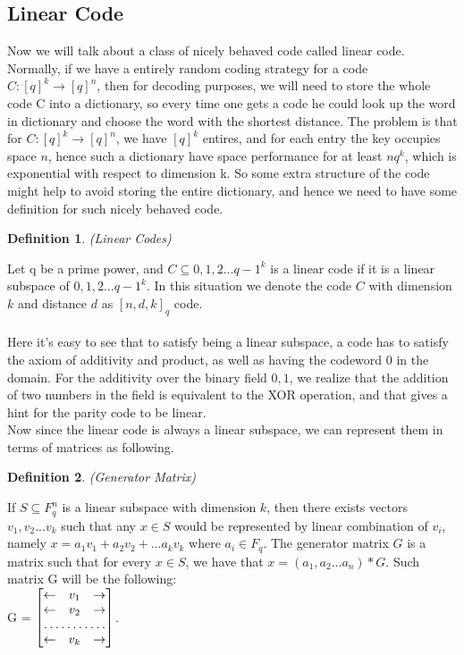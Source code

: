 \documentclass{article}
\newtheorem{Definition}{Definition}
\begin{document}
\subsection{Linear Code}
Now we will talk about a class of nicely behaved code called linear code. Normally, if we have a entirely random coding strategy for a code $C:[q]^k \rightarrow [q]^n$, then for decoding purposes, we will need to store the whole code C into a dictionary, so every time one gets a code he could look up the word in dictionary and choose the word with the shortest distance. The problem is that for $C:[q]^k \rightarrow [q]^n$, we have $[q]^k$ entires, and for each entry the key occupies space $n$, hence such a dictionary have space performance for at least $nq^k$, which is exponential with respect to dimension k. So some extra structure of the code might help to avoid storing the entire dictionary, and hence we need to have some definition for such nicely behaved code.
\begin{Definition}(Linear Codes)\end{Definition}
\noindent Let q be a prime power, and $C \subseteq {0,1,2...q-1}^k$ is a linear code if it is a linear subspace of ${0,1,2...q-1}^k$. In this situation we denote the code $C$ with dimension $k$ and distance $d$ as $[n,d,k]_q$ code.\\\\
Here it's easy to see that to satisfy being a linear subspace, a code has to satisfy the axiom of additivity and product, as well as having the codeword 0 in the domain. For the additivity over the binary field ${0,1}$, we realize that the addition of two numbers in the field is equivalent to the XOR operation, and that gives a hint for the parity code to be linear.\\
Now since the linear code is always a linear subspace, we can represent them in terms of matrices as following.
\begin{Definition}(Generator Matrix)\end{Definition}
\noindent If $S \subseteq F_q^n$ is a linear subspace with dimension $k$, then there exists vectors $v_1, v_2...v_k$ such that any $x \in S$ would be represented by linear combination of $v_i$, namely $x = a_1v_1 + a_2v_2+ ... a_kv_k$ where $a_i \in F_q$. The generator matrix $G$ is a matrix such that for every $x \in S$, we have that $x = (a_1,a_2...a_n)*G$. Such matrix G will be the following:\\
G =
$\begin{bmatrix}
    \leftarrow       & v_1 & \rightarrow \\
    \leftarrow       & v_2 & \rightarrow \\
    \hdotsfor{3} \\
    \leftarrow       & v_k & \rightarrow
\end{bmatrix}$.
\end{document}
